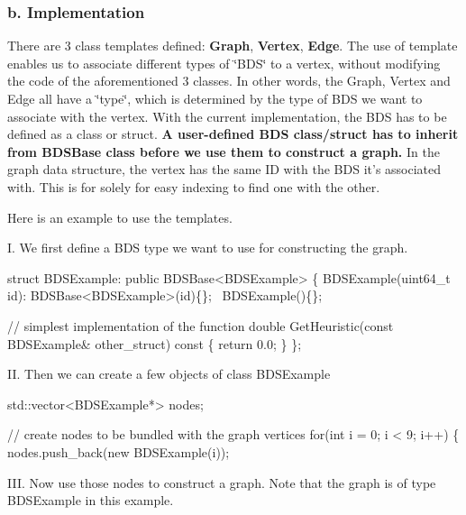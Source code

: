 \subsubsection*{b. Implementation}

There are 3 class templates defined\-: {\bfseries Graph}, {\bfseries Vertex}, {\bfseries Edge}. The use of template enables us to associate different types of \char`\"{}\-B\-D\-S\char`\"{} to a vertex, without modifying the code of the aforementioned 3 classes. In other words, the Graph, Vertex and Edge all have a \char`\"{}type\char`\"{}, which is determined by the type of B\-D\-S we want to associate with the vertex. With the current implementation, the B\-D\-S has to be defined as a class or struct. {\bfseries A user-\/defined B\-D\-S class/struct has to inherit from B\-D\-S\-Base class before we use them to construct a graph.} In the graph data structure, the vertex has the same I\-D with the B\-D\-S it's associated with. This is for solely for easy indexing to find one with the other.

Here is an example to use the templates.

I. We first define a B\-D\-S type we want to use for constructing the graph.


\begin{DoxyCode}
\textcolor{keyword}{struct }BDSExample: \textcolor{keyword}{public} BDSBase<BDSExample>
\{
    BDSExample(uint64\_t \textcolor{keywordtype}{id}):
        BDSBase<BDSExample>(id)\{\};
    ~BDSExample()\{\};

    \textcolor{comment}{// simplest implementation of the function}
    \textcolor{keywordtype}{double} GetHeuristic(\textcolor{keyword}{const} BDSExample& other\_struct)\textcolor{keyword}{ const }\{
        \textcolor{keywordflow}{return} 0.0;
    \}
\};
\end{DoxyCode}


I\-I. Then we can create a few objects of class B\-D\-S\-Example


\begin{DoxyCode}
std::vector<BDSExample*> nodes;

\textcolor{comment}{// create nodes to be bundled with the graph vertices}
\textcolor{keywordflow}{for}(\textcolor{keywordtype}{int} i = 0; i < 9; i++) \{
    nodes.push\_back(\textcolor{keyword}{new} BDSExample(i));
\end{DoxyCode}


I\-I\-I. Now use those nodes to construct a graph. Note that the graph is of type B\-D\-S\-Example in this example.


